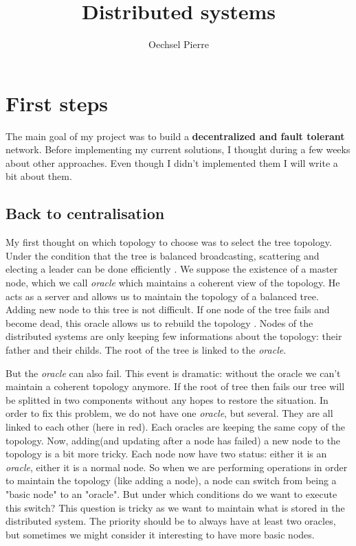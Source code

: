 \documentclass[a4paper]{article}
\title{Distributed systems}
\author{Oechsel Pierre}
\begin{document}
\maketitle

\section{First steps}

The main goal of my project was to build a \textbf{decentralized and fault tolerant} network.
Before implementing my current solutions, I thought during a few weeks about other approaches. Even though I didn't implemented them I will write a bit about them.

\subsection{Back to centralisation}

My first thought on which topology to choose was to select the tree topology. Under the condition that the tree is balanced broadcasting, scattering and electing a leader can be done efficiently \cite{tel2000introduction}. We suppose the existence of a master node, which we call \textit{oracle} which maintains a coherent view of the topology. He acts as a server and allows us to maintain the topology of a balanced tree. Adding new node to this tree is not difficult. If one node of the tree fails and become dead, this oracle allows us to rebuild the topology \cite{huang2005performance}. Nodes of the distributed systems are only keeping few informations about the topology: their father and their childs. The root of the tree is linked to the \textit{oracle}.

But the \textit{oracle} can also fail. This event is dramatic: without the oracle we can't maintain a coherent topology anymore. If the root of tree then fails our tree will be splitted in two components without any hopes to restore the situation.
In order to fix this problem, we do not have one \textit{oracle}, but several. They are all linked to each other (here in red). Each oracles are keeping the same copy of the topology.
Now, adding(and updating after a node has failed) a new node to the topology is a bit more tricky. Each node now have two status: either it is an \textit{oracle}, either it is a normal node. So when we are performing operations in order to maintain the topology (like adding a node), a node can switch from being a "basic node" to an "oracle". But under which conditions do we want to execute this switch? This question is tricky as we want to maintain what is stored in the distributed system. The priority should be to always have at least two oracles, but sometimes we might consider it interesting to have more basic nodes.
\end{document}
